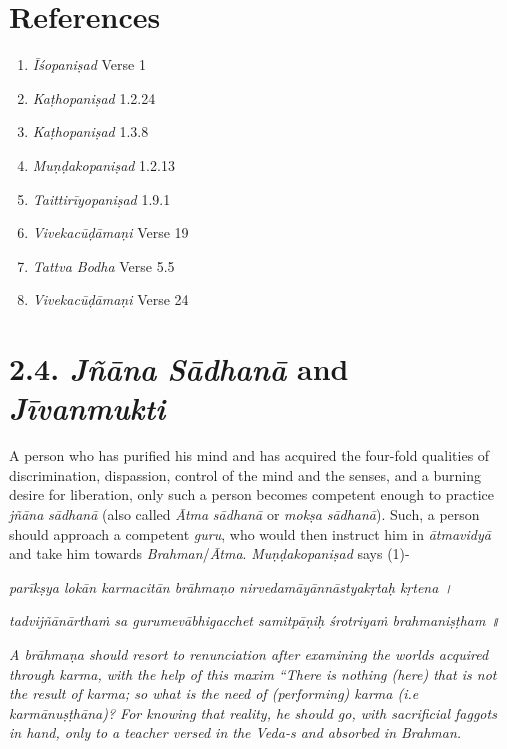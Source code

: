 \section*{References}

\begin{enumerate}
\item
  \emph{Īśopaniṣad} Verse 1
\item
  \emph{Kaṭhopaniṣad} 1.2.24
\item
  \emph{Kaṭhopaniṣad} 1.3.8
\item
  \emph{Muṇḍakopaniṣad} 1.2.13
\item
  \emph{Taittirīyopaniṣad} 1.9.1
\item
  \emph{Vivekacūḍāmaṇi} Verse 19
\item
  \emph{Tattva Bodha} Verse 5.5
\item
  \emph{Vivekacūḍāmaṇi} Verse 24
\end{enumerate}

\section{2.4. \emph{Jñāna} \emph{Sādhanā} and \emph{Jīvanmukti}}

A person who has purified his mind and has acquired the four-fold qualities of discrimination, dispassion, control of the mind and the senses, and a burning desire for liberation, only such a person becomes competent enough to practice \emph{jñāna} \emph{sādhanā} (also called \emph{Ātma} \emph{sādhanā} or \emph{mokṣa} \emph{sādhanā}). Such, a person should approach a competent \emph{guru}, who would then instruct him in \emph{ātmavidyā} and take him towards \emph{Brahman}/\emph{Ātma}. \emph{Muṇḍakopaniṣad} says (1)-

\emph{parīkṣya lokān karmacitān brāhmaṇo nirvedamāyānnāstyakṛtaḥ kṛtena ।}

\emph{tadvijñānārthaṁ sa gurumevābhigacchet samitpāṇiḥ śrotriyaṁ brahmaniṣṭham ॥ }

\emph{A brāhmaṇa should resort to renunciation after examining the worlds acquired through karma, with the help of this maxim ``There is nothing (here) that is not the result of karma; so what is the need of (performing) karma (i.e karmānuṣṭhāna)? For knowing that reality, he should go, with sacrificial faggots in hand, only to a teacher versed in the Veda-s and absorbed in Brahman.}

